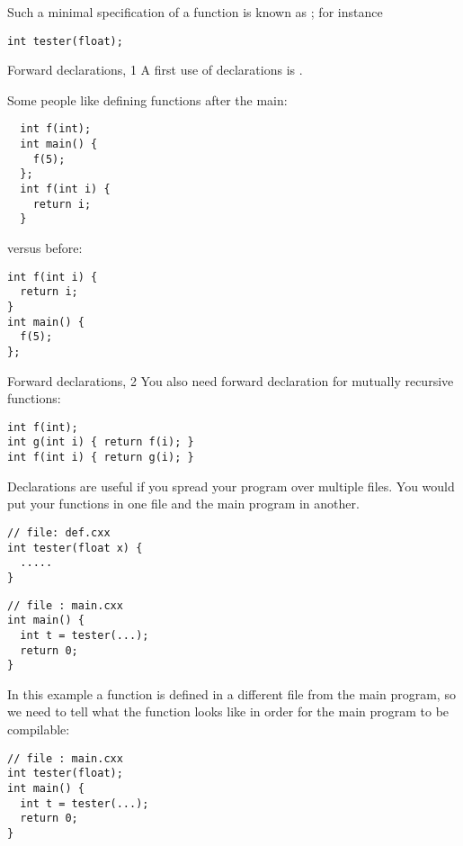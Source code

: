 Such a minimal specification of a function is known as
; for instance
\begin{lstlisting}
int tester(float);
\end{lstlisting}

\begin{block}{Forward declarations, 1}
  \label{sl:forward-proto1}
  A first use of declarations is .

  Some people like defining functions after the main:
\begin{multicols}{2}
\begin{lstlisting}
  int f(int);
  int main() {
    f(5);
  };
  int f(int i) {
    return i;
  }
\end{lstlisting}
\columnbreak
versus before:
\begin{lstlisting}
int f(int i) {
  return i;
}
int main() {
  f(5);
};
\end{lstlisting}
\end{multicols}
\end{block}

\begin{block}{Forward declarations, 2}
  \label{sl:forward-proto2}
  You also need forward declaration for mutually recursive functions:
\begin{lstlisting}
int f(int);
int g(int i) { return f(i); }
int f(int i) { return g(i); }
\end{lstlisting}
\end{block}

Declarations are useful if you spread your program over multiple
files. You would put your functions in one file
and the main program in another.

\begin{multicols}{2}  
\begin{lstlisting}
// file: def.cxx
int tester(float x) {
  .....
}
\end{lstlisting}
\vfill\columnbreak
\begin{lstlisting}
// file : main.cxx
int main() {
  int t = tester(...);
  return 0;
}
\end{lstlisting}
\end{multicols}

In this example a function 
is defined in a different file from the main program, so we need to
tell  what the function looks like in order for the main
program to be compilable:

\begin{lstlisting}
// file : main.cxx
int tester(float);
int main() {
  int t = tester(...);
  return 0;
}
\end{lstlisting}

